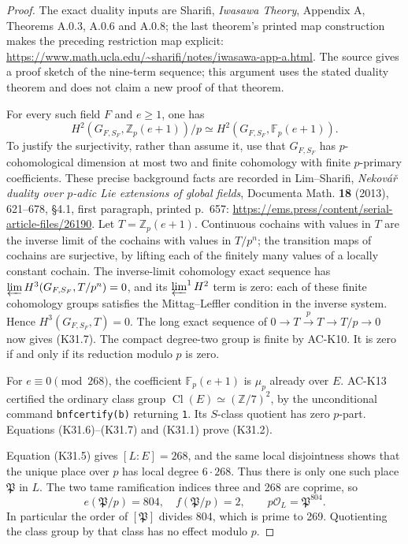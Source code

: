 \begin{proof}
The exact duality inputs are Sharifi, \emph{Iwasawa Theory},
Appendix A, Theorems A.0.3, A.0.6 and A.0.8; the last theorem's
printed map construction makes the preceding restriction map
explicit:
\url{https://www.math.ucla.edu/~sharifi/notes/iwasawa-app-a.html}.
The source gives a proof sketch of the nine-term sequence; this
argument uses the stated duality theorem and does not claim a
new proof of that theorem.

For every such field \(F\) and \(e\geq1\), one has
\[
 H^2(G_{F,S_F},\mathbb Z_p(e+1))/p
       \simeq H^2(G_{F,S_F},\mathbb F_p(e+1)).                 \tag{K31.7}
\]
To justify the surjectivity, rather than assume it, use that
\(G_{F,S_F}\) has \(p\)-cohomological dimension at most two
and finite cohomology with finite \(p\)-primary coefficients.
These precise background facts are recorded in Lim--Sharifi,
\emph{Nekov\'a\v r duality over \(p\)-adic Lie extensions of
global fields}, Documenta Math. \textbf{18} (2013), 621--678,
\S4.1, first paragraph, printed p.~657:
\url{https://ems.press/content/serial-article-files/26190}.
Let \(T=\mathbb Z_p(e+1)\).  Continuous cochains with values
in \(T\) are the inverse limit of the cochains with values in
\(T/p^n\); the transition maps of cochains are surjective,
by lifting each of the finitely many values of a locally
constant cochain.  The inverse-limit cohomology exact sequence
has \(\varprojlim H^3(G_{F,S_F},T/p^n)=0\), and its
\(\varprojlim^1 H^2\) term is zero: each of these finite
cohomology groups satisfies the Mittag--Leffler condition in
the inverse system.  Hence \(H^3(G_{F,S_F},T)=0\).
The long exact sequence of
\(0\to T\xrightarrow{p}T\to T/p\to0\) now gives (K31.7).
The compact degree-two group is finite by AC-K10.  It is zero
if and only if its reduction modulo \(p\) is zero.

For \(e\equiv0\pmod{268}\), the coefficient
\(\mathbb F_p(e+1)\) is \(\mu_p\) already over \(E\).
AC-K13 certified the ordinary class group
\(\operatorname{Cl}(E)\simeq(\mathbb Z/7)^2\), by the
unconditional command \texttt{bnfcertify(b)} returning
\texttt{1}.  Its \(S\)-class quotient has zero \(p\)-part.
Equations (K31.6)--(K31.7) and (K31.1) prove (K31.2).

Equation (K31.5) gives \([L:E]=268\), and the same local
disjointness shows that the unique place over \(p\) has local
degree \(6\cdot268\).  Thus there is only one such place
\(\mathfrak P\) in \(L\).  The two tame ramification indices
three and 268 are coprime, so
\[
 e(\mathfrak P/p)=804,\quad f(\mathfrak P/p)=2,
 \qquad p\mathcal O_L=\mathfrak P^{804}.                       \tag{K31.8}
\]
In particular the order of \([\mathfrak P]\) divides 804,
which is prime to 269.  Quotienting the class group by that
class has no effect modulo \(p\).


\end{proof}
